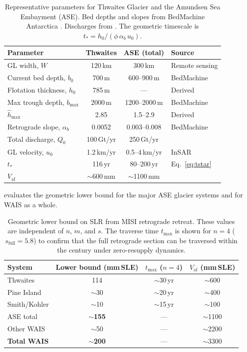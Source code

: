\documentclass[11pt]{article}
\newcommand{\hhat}{\hat{h}}
\newcommand{\Vaf}{V_{\mathrm{af}}}
\begin{document}
\begin{table}[ht]
\centering
\caption{Representative parameters for Thwaites Glacier and the Amundsen Sea Embayment (ASE). Bed depths and slopes from BedMachine Antarctica \citep{Morlighem2020}. Discharges from \citet{Rignot2019}. The geometric timescale is $t_* = h_0/(\phi\,\alpha_b\,u_0)$.}
\label{tab:parameters}
\smallskip
\begin{tabular}{l c c l}
\toprule
Parameter & Thwaites & ASE (total) & Source \\
\midrule
GL width, $W$ & 120\,km & 300\,km & Remote sensing \\
Current bed depth, $b_0$ & 700\,m & 600--900\,m & BedMachine \\
Flotation thickness, $h_0$ & 785\,m & --- & Derived \\
Max trough depth, $b_{\max}$ & 2000\,m & 1200--2000\,m & BedMachine \\
$\hhat_{\max}$ & 2.85 & 1.5--2.9 & Derived \\
Retrograde slope, $\alpha_b$ & 0.0052 & 0.003--0.008 & BedMachine \\
Total discharge, $Q_0$ & 100\,Gt/yr & 250\,Gt/yr & \citet{Rignot2019} \\
GL velocity, $u_0$ & 1.2\,km/yr & 0.5--4\,km/yr & InSAR \\
$t_*$ & 116\,yr & 80--200\,yr & Eq.~\eqref{eq:tstar} \\
$\Vaf$ & $\sim$600\,mm & $\sim$1100\,mm & \citet{Morlighem2020} \\
\bottomrule
\end{tabular}
\end{table}

 evaluates the geometric lower bound for the major ASE glacier systems and for WAIS as a whole.

\begin{table}[ht]
\centering
\caption{Geometric lower bound on SLR from MISI retrograde retreat. These values are independent of $n$, $m$, and $s$. The traverse time $t_{\max}$ is shown for $n = 4$ ($s_{\mathrm{full}} = 5.8$) to confirm that the full retrograde section can be traversed within the century under zero-resupply dynamics.}
\label{tab:lower_bounds}
\smallskip
\begin{tabular}{l c c c}
\toprule
System & Lower bound (mm\,SLE) & $t_{\max}$ ($n{=}4$) & $\Vaf$ (mm\,SLE) \\
\midrule
Thwaites & 114 & $\sim$30\,yr & $\sim$600 \\
Pine Island & $\sim$30 & $\sim$20\,yr & $\sim$400 \\
Smith/Kohler & $\sim$10 & $\sim$15\,yr & $\sim$100 \\
\midrule
ASE total & $\sim$\textbf{155} & --- & $\sim$1100 \\
Other WAIS & $\sim$50 & --- & $\sim$2200 \\
\midrule
\textbf{Total WAIS} & $\sim$\textbf{200} & --- & $\sim$3300 \\
\bottomrule
\end{tabular}
\end{table}
\end{document}
